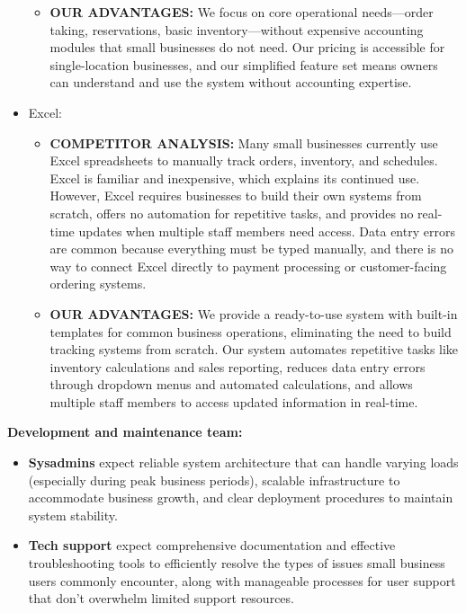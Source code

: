 \documentclass[]{VUMIFTemplateClass}
\begin{document}
\begin{itemize}
\begin{itemize}
        \item \textbf{OUR ADVANTAGES:} 
        We focus on core operational needs—order taking,
        reservations, basic inventory—without expensive accounting modules that
        small businesses do not need. Our pricing is accessible for single-location
        businesses, and our simplified feature set means owners can understand and
        use the system without accounting expertise.
    \end{itemize}
    

    \item Excel: 
    
    \begin{itemize}
        \item \textbf{COMPETITOR ANALYSIS:}
        Many small businesses currently use Excel spreadsheets
        to manually track orders, inventory, and schedules. Excel is familiar and
        inexpensive, which explains its continued use. However, Excel requires
        businesses to build their own systems from scratch, offers no automation for
        repetitive tasks, and provides no real-time updates when multiple staff
        members need access. Data entry errors are common because everything must be
        typed manually, and there is no way to connect Excel directly to payment
        processing or customer-facing ordering systems.
        
        \item \textbf{OUR ADVANTAGES:} 
        We provide a ready-to-use system with built-in
        templates for common business operations, eliminating the need to build
        tracking systems from scratch. Our system automates repetitive tasks like
        inventory calculations and sales reporting, reduces data entry errors
        through dropdown menus and automated calculations, and allows multiple staff
        members to access updated information in real-time.
        \end{itemize}
        
\end{itemize}

\textbf{Development and maintenance team:}
\begin{itemize}
    \item \textbf{Sysadmins} expect reliable system architecture that can handle
    varying loads (especially during peak business periods), scalable
    infrastructure to accommodate business growth, and clear deployment
    procedures to maintain system stability.
    \item \textbf{Tech support} expect comprehensive documentation and effective
    troubleshooting tools to efficiently resolve the types of issues small
    business users commonly encounter, along with manageable processes for user
    support that don't overwhelm limited support resources.
\end{itemize}
\end{document}
